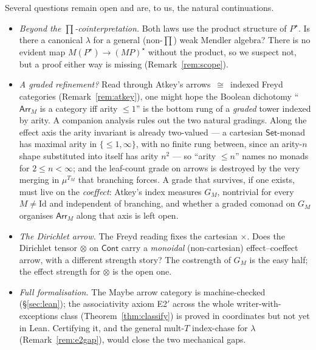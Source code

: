 \documentclass[11pt]{amsart}
\theoremstyle{plain}
\theoremstyle{definition}
\theoremstyle{remark}
\newcommand{\Set}{\mathsf{Set}}
\newcommand{\Cont}{\mathsf{Cont}}
\newcommand{\Arr}{\mathsf{Arr}}
\begin{document}
Several questions remain open and are, to us, the natural continuations.
\begin{itemize}
  \item \emph{Beyond the $\prod$-cointerpretation.} Both laws use the product structure of
  $P^\star$. Is there a canonical $\lambda$ for a general (non-$\prod$) weak Mendler algebra?
  There is no evident map $M(P^\star)\to(MP)^\star$ without the product, so we suspect not, but
  a proof either way is missing (Remark~\ref{rem:scope}).
  \item \emph{A graded refinement?} Read through Atkey's arrows~$\cong$~indexed Freyd
  categories (Remark~\ref{rem:atkey}), one might hope the Boolean dichotomy ``$\Arr_M$ is a
  category iff arity ${\le}1$'' is the bottom rung of a \emph{graded} tower indexed by arity.
  A companion analysis rules out the two natural gradings. Along the effect axis the arity
  invariant is already two-valued --- a cartesian $\Set$-monad has maximal arity in
  $\{{\le}1,\infty\}$, with no finite rung between, since an arity-$n$ shape substituted into
  itself has arity $n^2$ --- so ``arity ${\le}n$'' names no monads for $2\le n<\infty$; and the
  leaf-count grade on arrows is destroyed by the very merging in $\mu^{T_M}$ that branching
  forces. A grade that survives, if one exists, must live on the \emph{coeffect}: Atkey's index
  measures $G_M$, nontrivial for every $M\neq\mathrm{Id}$ and independent of branching, and
  whether a graded comonad on $G_M$ organises $\Arr_M$ along that axis is left open.
  \item \emph{The Dirichlet arrow.} The Freyd reading fixes the cartesian $\times$. Does the
  Dirichlet tensor $\otimes$ on $\Cont$ carry a \emph{monoidal} (non-cartesian) effect--coeffect
  arrow, with a different strength story? The costrength of $G_M$ is the easy half; the effect
  strength for $\otimes$ is the open one.
  \item \emph{Full formalisation.} The Maybe arrow category is machine-checked
  (\S\ref{sec:lean}); the associativity axiom E2$'$ across the whole writer-with-exceptions
  class (Theorem~\ref{thm:classify}) is proved in coordinates but not yet in Lean. Certifying
  it, and the general mult-$T$ index-chase for $\lambda$ (Remark~\ref{rem:e2gap}), would close
  the two mechanical gaps.
\end{itemize}
\end{document}
